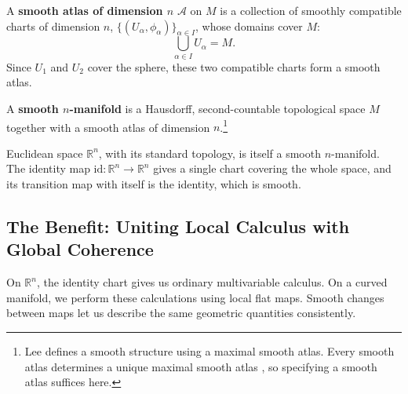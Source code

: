 \begin{definition}
        A \textbf{smooth atlas of dimension $n$} $\mathcal{A}$ on $M$ is a
        collection of smoothly compatible charts of dimension $n$,
        $\{(U_\alpha, \phi_\alpha)\}_{\alpha \in I}$, whose domains cover $M$:
        \begin{equation}
            \bigcup_{\alpha \in I} U_\alpha = M.
        \end{equation}
        Since $U_1$ and $U_2$ cover the sphere, these two compatible charts
        form a smooth atlas.

        A \textbf{smooth $n$-manifold} is a Hausdorff, second-countable
        topological space $M$ together with a smooth atlas of dimension $n$.\footnote{%
            Lee defines a smooth structure using a maximal smooth atlas.
            Every smooth atlas determines a unique maximal smooth atlas
            \cite[Proposition~1.17, p.~13]{lee2013smooth}, so specifying a
            smooth atlas suffices here.}
    \end{definition}

    Euclidean space $\mathbb{R}^n$, with its standard topology, is itself a
    smooth $n$-manifold. The identity map $\mathrm{id} \colon \mathbb{R}^n
    \to \mathbb{R}^n$ gives a single chart covering the whole space, and its
    transition map with itself is the identity, which is smooth.

    \subsection{The Benefit: Uniting Local Calculus with Global Coherence}
    On $\mathbb{R}^n$, the identity chart gives us ordinary multivariable
    calculus. On a curved manifold, we perform these calculations using local
    flat maps. Smooth changes between maps let us describe the same geometric
    quantities consistently.
